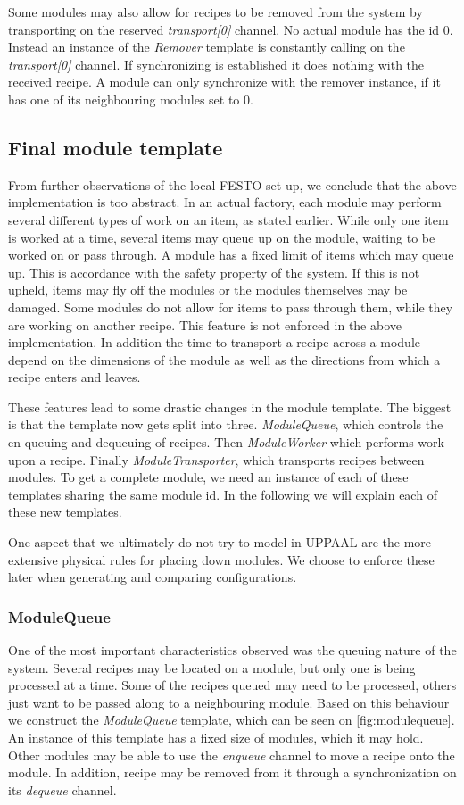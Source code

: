 Some modules may also allow for recipes to be removed from the system by transporting on the reserved \emph{transport[0]} channel. No actual module has the id 0. Instead an instance of the \emph{Remover} template is constantly calling on the \emph{transport[0]} channel. If synchronizing is established it does nothing with the received recipe. A module can only synchronize with the remover instance, if it has one of its neighbouring modules set to 0. 

\subsection{Final module template}
From further observations of the local FESTO set-up, we conclude that the above implementation is too abstract. In an actual factory, each module may perform several different types of work on an item, as stated earlier. While only one item is worked at a time, several items may queue up on the module, waiting to be worked on or pass through. A module has a fixed limit of items which may queue up. This is accordance with the safety property of the system. If this is not upheld, items may fly off the modules or the modules themselves may be damaged. Some modules do not allow for items to pass through them, while they are working on another recipe. This feature is not enforced in the above implementation. In addition the time to transport a recipe across a module depend  on the dimensions of the module as well as the directions from which a recipe enters and leaves.

These features lead to some drastic changes in the module template. The biggest is that the template now gets split into three. \emph{ModuleQueue}, which controls the en-queuing and dequeuing of recipes. Then \emph{ModuleWorker} which performs work upon a recipe. Finally \emph{ModuleTransporter}, which transports recipes between modules. To get a complete module, we need an instance of each of these templates sharing the same module id. In the following we will explain each of these new templates.

One aspect that we ultimately do not try to model in UPPAAL are the more extensive physical rules for placing down modules. We choose to enforce these later when generating and comparing configurations. 

\subsubsection{ModuleQueue}\label{subs:modulequeue}
One of the most important characteristics observed was the queuing nature of the system. Several recipes may be located on a module, but only one is being processed at a time. Some of the recipes queued may need to be processed, others just want to be passed along to a neighbouring module. Based on this behaviour we construct the \emph{ModuleQueue} template, which can be seen on \cref{fig:modulequeue}. An instance of this template has a fixed size of modules, which it may hold. Other modules may be able to use the \emph{enqueue} channel to move a recipe onto the module. In addition, recipe may be removed from it through a synchronization on its \emph{dequeue} channel.

